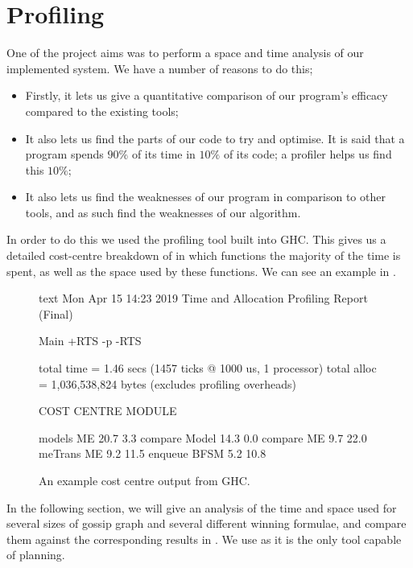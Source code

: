 \documentclass[ %
                    author={Leo Poulson},
                supervisor={Dr. Steven Ramsay},
                    degree={BSc},
                     title={Epistemic Planning for the Dynamic Gossip problem},
                  subtitle={},
                      year={2019} ]{dissertation}
\begin{document}
\section{Profiling}

One of the project aims was to perform a space and time analysis of our
implemented system. We have a number of reasons to do this;

\begin{itemize}
\setlength\itemsep{1em}
\item Firstly, it lets us give a quantitative comparison of our program's
  efficacy compared to the existing tools;
\item It also lets us find the parts of our code to try and optimise. It is said
  that a program spends $90\%$ of its time in $10\%$ of its code; a profiler helps
  us find this $10\%$;
\item It also lets us find the weaknesses of our program in comparison to other
  tools, and as such find the weaknesses of our algorithm.
\end{itemize}

In order to do this we used the profiling tool built into GHC. This gives us a
detailed cost-centre breakdown of in which functions the majority of the time is
spent, as well as the space used by these functions. We can see an example in
.

\begin{figure}[h]
  \centering
\begin{cminted}{text}
	Mon Apr 15 14:23 2019 Time and Allocation Profiling Report  (Final)

	   Main +RTS -p -RTS

	total time  =        1.46 secs   (1457 ticks @ 1000 us, 1 processor)
	total alloc = 1,036,538,824 bytes  (excludes profiling overheads)

  COST CENTRE            MODULE                 %

  models                 ME                      20.7    3.3
  compare                Model                   14.3    0.0
  compare                ME                       9.7   22.0
  meTrans                ME                       9.2   11.5
  enqueue                BFSM                     5.2   10.8
\end{cminted}
  \caption{An example cost centre output from GHC.}
  \label{fig:costcentre}
\end{figure}

In the following section, we will give an analysis of the time and space used
for several sizes of gossip graph and several different winning formulae, and
compare them against the corresponding results in \cite{GithubGossip}. We use
\cite{GithubGossip} as it is the only tool capable of planning.
\end{document}

